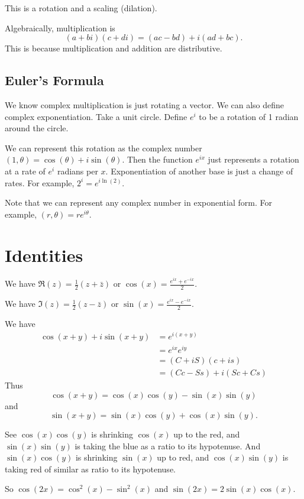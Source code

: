 \documentclass[../main.tex]{subfiles}
\begin{document}


This is a rotation and a scaling (dilation).

Algebraically, multiplication is
\[ (a + bi)(c + di) = (ac - bd) + i (ad + bc). \]
This is because multiplication and addition are distributive.



\subsection{Euler's Formula}

We know complex multiplication is just rotating a vector.
We can also define complex exponentiation.
Take a unit circle.
Define \( e^{i} \) to be a rotation of 1 radian around the circle.




We can represent this rotation as the complex number
\( (1, \theta) = \cos(\theta) + i\sin(\theta) \).
Then the function \( e^{ix} \) just represents a rotation at a rate of
\( e^i \) radians per \( x \).
Exponentiation of another base is just a change of rates.
For example, \( 2^i = e^{i \ln(2)} \).



Note that we can represent any complex number in exponential form.
For example, \( (r, \theta) = re^{i \theta} \).




\section{Identities}

We have \( \Re(z) = \frac{1}{2} (z + \bar z) \)
or \( \cos(x) = \frac{e^{ix} + e^{-ix}}{2} \).



We have \( \Im(z) = \frac{1}{2}(z - \bar z) \)
or \( \sin(x) = \frac{e^{ix} - e^{-ix}}{2} \).



We have
\begin{align*}
    \cos(x + y) + i \sin(x + y) &= e^{i(x + y)} \\
    &= e^{ix} e^{iy} \\
    &= (C + i S)(c + i s) \\
    &= (Cc - Ss) + i (Sc + Cs)
\end{align*}
Thus
\[ \cos(x + y) = \cos(x) \cos(y) - \sin(x) \sin(y) \]
and
\[ \sin(x + y) = \sin(x) \cos(y) + \cos(x) \sin(y). \]




See \( \cos(x) \cos(y) \) is shrinking \( \cos(x) \) up to the red,
and \( \sin(x) \sin(y) \) is taking the blue as a ratio to its hypotenuse.
And \( \sin(x) \cos(y) \) is shrinking \( \sin(x) \) up to red,
and \( \cos(x) \sin(y) \) is taking red of similar as ratio to its hypotenuse.

So \( \cos(2x) = \cos^2(x) - \sin^2(x) \)
and \( \sin(2x) = 2 \sin(x) \cos(x) \).
\end{document}
